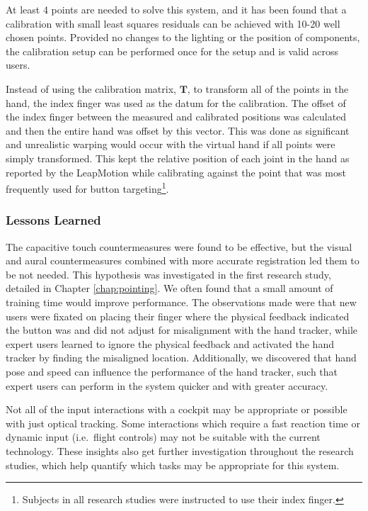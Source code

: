 At least 4 points are needed to solve this system, and it has been found that a calibration with small least squares residuals can be achieved with 10-20 well chosen points.
Provided no changes to the lighting or the position of components, the calibration setup can be performed once for the setup and is valid across users.

Instead of using the calibration matrix, $\mathbf{T}$, to transform all of the points in the hand, the index finger was used as the datum for the calibration.
The offset of the index finger between the measured and calibrated positions was calculated and then the entire hand was offset by this vector.
This was done as significant and unrealistic warping would occur with the virtual hand if all points were simply transformed.
This kept the relative position of each joint in the hand as reported by the LeapMotion while calibrating against the point that was most frequently used for button targeting\footnote{Subjects in all research studies were instructed to use their index finger.}.

\subsubsection{Lessons Learned}

The capacitive touch countermeasures were found to be effective, but the visual and aural countermeasures combined with more accurate registration led them to be not needed.
This hypothesis was investigated in the first research study, detailed in Chapter \ref{chap:pointing}.
We often found that a small amount of training time would improve performance.
The observations made were that new users were fixated on placing their finger where the physical feedback indicated the button was and did not adjust for misalignment with the hand tracker, while expert users learned to ignore the physical feedback and activated the hand tracker by finding the misaligned location.
Additionally, we discovered that hand pose and speed can influence the performance of the hand tracker, such that expert users can perform in the system quicker and with greater accuracy.

Not all of the input interactions with a cockpit may be appropriate or possible with just optical tracking.
Some interactions which require a fast reaction time or dynamic input (i.e.\ flight controls) may not be suitable with the current technology.
These insights also get further investigation throughout the research studies, which help quantify which tasks may be appropriate for this system.

